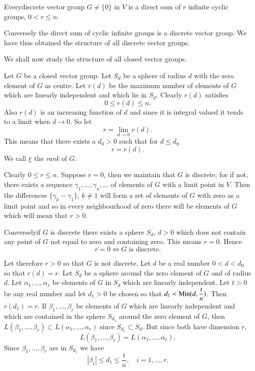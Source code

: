 \begin{thm}\label{chap1:thm1}
Every\pageoriginale discrete vector group $G\neq \{0\}$ in $V$ is a
direct sum of $r$ infinite cyclic groups, $0<r\leqslant n$.
\end{thm}

Conversely the direct sum of cyclic infinite groups is a discrete
vector group. We have thus obtained the structure of all discrete
vector groups.

We shall now study the structure of all closed vector groups.

Let $G$ be a closed vector group. Let $S_{d}$ be a sphere of radius
$d$ with the zero element of $G$ as centre. Let $r(d)$ be the maximum
number of elements of $G$ which are linearly independent and which lie
in $S_{d}$. Clearly $r(d)$ satisfies
$$
0\leqslant r(d)\leqslant n.
$$
Also $r(d)$ is an increasing function of $d$ and since it is
integral valued it tends to a limit when $d\to 0$. So let 
$$
r=\lim\limits_{d\to 0}r(d).
$$
This means that there exists a $d_{0}>0$ such that for $d\leqslant
d_{0}$ 
$$
r=r(d).
$$
We call $\underline{r}$ the {\em rank} of $G$.

Clearly $0\leqslant r\leqslant n$. Suppose $r=0$, then we maintain
that $G$ is discrete; for if not, there exists a sequence
$\gamma_{1},\ldots,\gamma_{n},\ldots$ of elements of $G$ with a limit
point in $V$. Then the differences $\{\gamma_{k}-\gamma_{1}\}$, $k\neq
1$ will form a set of elements of $G$ with zero as a limit point and
so in every neighbourhood of zero there will be elements of $G$ which
will mean that $r>0$.

Conversely\pageoriginale if $G$ is discrete there exists a sphere
$S_{d}$, $d>0$ which does not contain any point of $G$ not equal to
zero and containing zero. This means $r=0$. Hence
$$
r=0\Leftrightarrow G \text{ \ is discrete.}
$$

Let therefore $r>0$ so that $G$ is not discrete. Let $d$ be a real
number $0<d<d_{0}$ so that $r(d)=r$. Let $S_{d}$ be a sphere around
the zero element of $G$ and of radius $d$. Let
$\alpha_{1},\ldots,\alpha_{r}$ be elements of $G$ in $S_{d}$ which are
linearly independent. Let $t>0$ be any real number and let $d_{1}>0$
be chosen so that $d_{1}<\operatorname{Min}(d,\dfrac{t}{n})$. Then $r(d_{1})=r$. If
$\beta_{1}, \ldots,\beta_{r}$ be elements of $G$ which are linearly
independent and which are contained in the sphere $S_{d_{1}}$ around
the zero element of $G$, then
$L(\beta_{1},\ldots,\beta_{r}) \subset L(\alpha_{1},\ldots,\alpha_{r})$ since
$S_{d_{1}}\subset S_{d}$. But since both have dimension $r$,
$$
L(\beta_{1},\ldots,\beta_{r})=L(\alpha_{1},\ldots,\alpha_{r}).
$$
Since $\beta_{1},\ldots,\beta_{r}$ are in $S_{d_{1}}$ we have 
$$
|\beta_{i}|\leqslant d_{1}\leqslant \frac{t}{n},\quad i=1,\ldots,r.
$$

